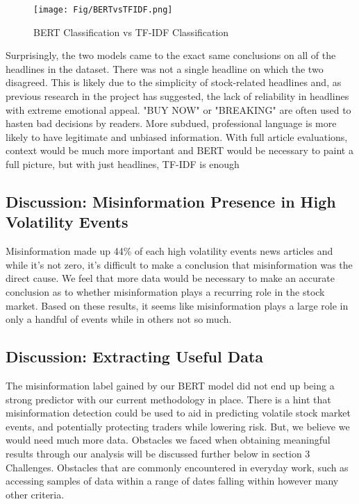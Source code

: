 \documentclass{article}
\begin{document}
\begin{figure}[H]
    \centering
    \texttt{[image: Fig/BERTvsTFIDF.png]}
    \caption{BERT Classification vs TF-IDF Classification}
    \label{fig:bertvtf}
\end{figure}

Surprisingly, the two models came to the exact same conclusions on all of the headlines in the dataset. There was not a single headline on which the two disagreed. This is likely due to the simplicity of stock-related headlines and, as previous research in the project has suggested, the lack of reliability in headlines with extreme emotional appeal. "BUY NOW" or "BREAKING" are often used to hasten bad decisions by readers. More subdued, professional language is more likely to have legitimate and unbiased information. With full article evaluations, context would be much more important and BERT would be necessary to paint a full picture, but with just headlines, TF-IDF is enough
\subsection{Discussion: Misinformation Presence in High Volatility Events}

Misinformation made up 44\% of each high volatility events news articles and while it's not zero, it's difficult to make a conclusion that misinformation was the direct cause. We feel that more data would be necessary to make an accurate conclusion as to whether misinformation plays a recurring role in the stock market. Based on these results, it seems like misinformation plays a large role in only a handful of events while in others not so much. 

\subsection{Discussion: Extracting Useful Data}

The misinformation label gained by our BERT model did not end up being a strong predictor with our current methodology in place. There is a hint that misinformation detection could be used to aid in predicting volatile stock market events, and potentially protecting traders while lowering risk. But, we believe we would need much more data. Obstacles we faced when obtaining meaningful results through our analysis will be discussed further below in section 3 Challenges. Obstacles that are commonly encountered in everyday work, such as accessing samples of data within a range of dates falling within however many other criteria.
\end{document}
